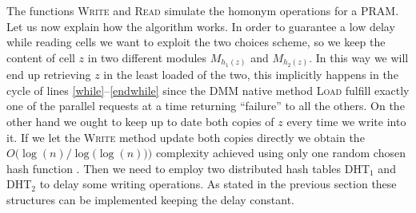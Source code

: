The functions \textsc{Write} and \textsc{Read} simulate the homonym operations
for a PRAM. Let us now explain how the algorithm works. In order to guarantee
a low delay while reading cells we want to exploit the two choices scheme,
so we keep the content of cell $z$ in two different modules $M_{h_1(z)}$ and
$M_{h_2(z)}$. In this way we will end up retrieving $z$ in the least loaded
of the two, this implicitly happens in the cycle of lines
\ref{while}--\ref{endwhile} since
the DMM native method \textsc{Load} fulfill exactly one of the parallel requests at
a time returning ``failure'' to all the others.
On the other hand we ought to keep up to date both copies of $z$
every time we write into it. If we let the \textsc{Write} method update
both copies directly we obtain the $O\bigl(\log(n)\bigr / \log\bigl(\log(n)\bigr)\big)$ complexity achieved using only
one random chosen hash function \cite{art}. Then we need to employ two
distributed hash tables DHT$_1$ and DHT$_2$ to delay some writing operations.
As stated in the previous section these structures can be implemented keeping
the delay constant.









